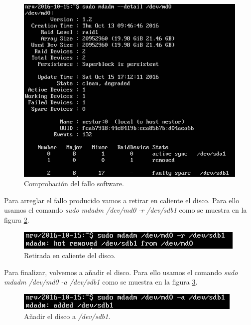 \documentclass[a4paper,titlepage,12pt]{report}	%
\numberwithin{figure}{section} %
\numberwithin{table}{section} %
\begin{document}
	\begin{figure}[H]
		\centering
		\includegraphics[scale=0.68]{./Imagenes/P1/ComprobarRAID2.png}
		\caption[Comprobación del fallo software.]{Comprobación del fallo software.}
		\label{P1-comprobacionRAID2}
	\end{figure}

	Para arreglar el fallo producido vamos a retirar en caliente el disco. Para ello usamos el comando \textit{sudo mdadm /dev/md0 -r /dev/sdb1} como se muestra en la figura \ref{P1-comprobacionRAID3}.

	\begin{figure}[H]
		\includegraphics[width=\linewidth]{./Imagenes/P1/ComprobarRAID3.png}
		\vspace{-0.5cm}
		\caption[Retirada en caliente del disco.]{Retirada en caliente del disco.}
		\label{P1-comprobacionRAID3}
	\end{figure}

	Para finalizar, volvemos a añadir el disco. Para ello usamos el comando \textit{sudo mdadm /dev/md0 -a /dev/sdb1} como se muestra en la figura \ref{P1-comprobacionRAID4}.

	\begin{figure}[H]
		\includegraphics[width=\linewidth]{./Imagenes/P1/ComprobarRAID4.png}
		\vspace{-0.5cm}
		\caption[Añadir el disco a \textit{/dev/sdb1}.]{Añadir el disco a \textit{/dev/sdb1}.}
		\label{P1-comprobacionRAID4}
	\end{figure}
\end{document}
